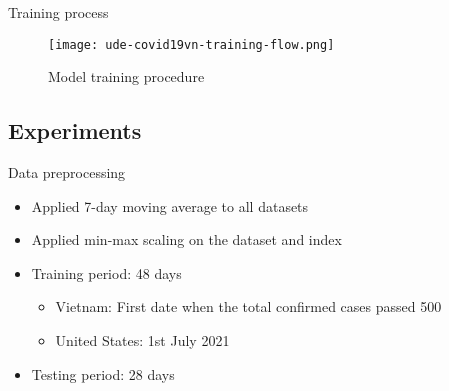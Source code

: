 \begin{frame}{Training process}
    \begin{figure}[h]
        \centering
        \texttt{[image: ude-covid19vn-training-flow.png]}
        \caption[Training procedure]{Model training procedure}
        \label{fig:model-training-flow}
    \end{figure}
\end{frame}





\subsection{Experiments}

\begin{frame}{Data preprocessing}
    \begin{itemize}
        \item<1-> Applied 7-day moving average to all datasets
        \item<1-> Applied min-max scaling on the  dataset and  index
        \item<2-> Training period: 48 days
        \begin{itemize}
            \item Vietnam: First date when the total confirmed cases passed 500
            \item United States: 1st July 2021
        \end{itemize}
        \item<3-> Testing period: 28 days
    \end{itemize}
\end{frame}

